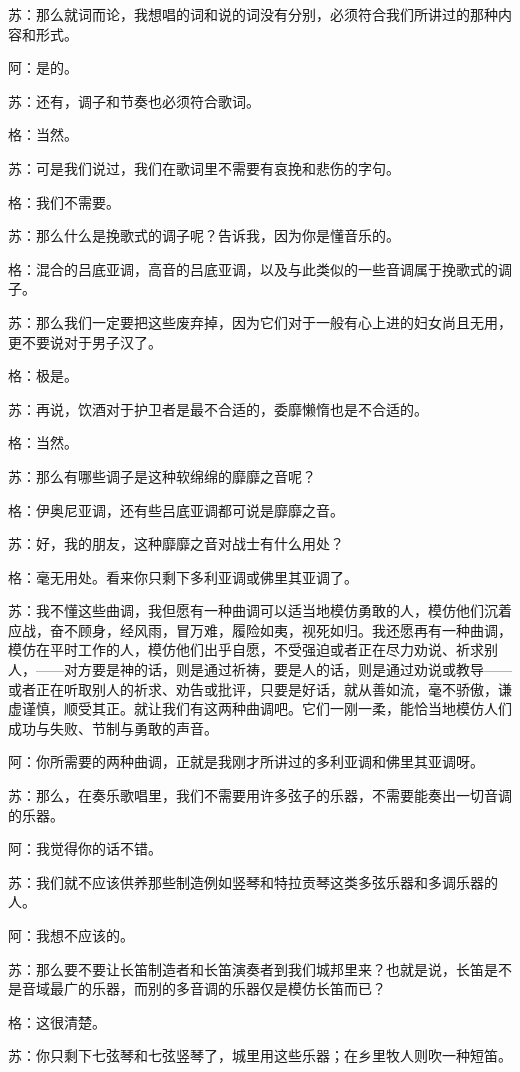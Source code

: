\documentclass[12pt,oneside]{book}
\begin{document}
苏：那么就词而论，我想唱的词和说的词没有分别，必须符合我们所讲过的那种内容和形式。

阿：是的。

苏：还有，调子和节奏也必须符合歌词。

格：当然。

苏：可是我们说过，我们在歌词里不需要有哀挽和悲伤的字句。

格：我们不需要。

苏：那么什么是挽歌式的调子呢？告诉我，因为你是懂音乐的。

格：混合的吕底亚调，高音的吕底亚调，以及与此类似的一些音调属于挽歌式的调子。

苏：那么我们一定要把这些废弃掉，因为它们对于一般有心上进的妇女尚且无用，更不要说对于男子汉了。

格：极是。

苏：再说，饮酒对于护卫者是最不合适的，委靡懒惰也是不合适的。

格：当然。

苏：那么有哪些调子是这种软绵绵的靡靡之音呢？

格：伊奥尼亚调，还有些吕底亚调都可说是靡靡之音。

苏：好，我的朋友，这种靡靡之音对战士有什么用处？

格：毫无用处。看来你只剩下多利亚调或佛里其亚调了。

苏：我不懂这些曲调，我但愿有一种曲调可以适当地模仿勇敢的人，模仿他们沉着应战，奋不顾身，经风雨，冒万难，履险如夷，视死如归。我还愿再有一种曲调，模仿在平时工作的人，模仿他们出乎自愿，不受强迫或者正在尽力劝说、祈求别人，——对方要是神的话，则是通过祈祷，要是人的话，则是通过劝说或教导——或者正在听取别人的祈求、劝告或批评，只要是好话，就从善如流，毫不骄傲，谦虚谨慎，顺受其正。就让我们有这两种曲调吧。它们一刚一柔，能恰当地模仿人们成功与失败、节制与勇敢的声音。

阿：你所需要的两种曲调，正就是我刚才所讲过的多利亚调和佛里其亚调呀。

苏：那么，在奏乐歌唱里，我们不需要用许多弦子的乐器，不需要能奏出一切音调的乐器。

阿：我觉得你的话不错。

苏：我们就不应该供养那些制造例如竖琴和特拉贡琴这类多弦乐器和多调乐器的人。

阿：我想不应该的。

苏：那么要不要让长笛制造者和长笛演奏者到我们城邦里来？也就是说，长笛是不是音域最广的乐器，而别的多音调的乐器仅是模仿长笛而已？

格：这很清楚。

苏：你只剩下七弦琴和七弦竖琴了，城里用这些乐器；在乡里牧人则吹一种短笛。
\end{document}
